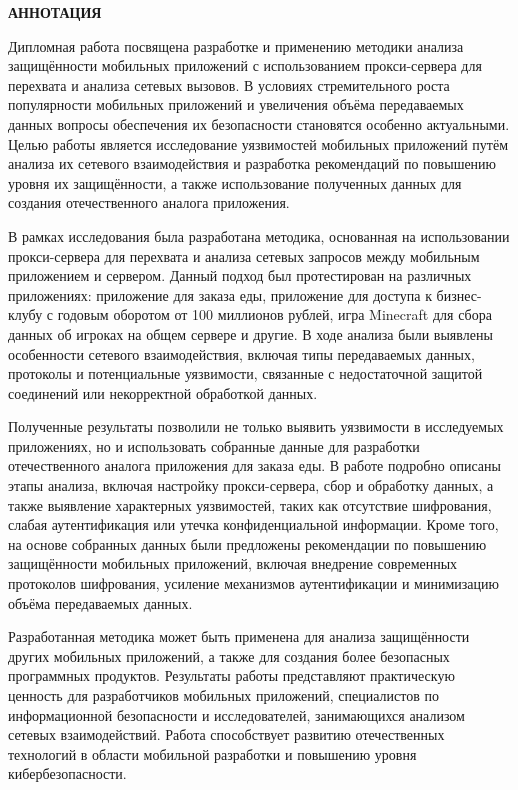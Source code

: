 \newpage
\begin{center}
  \textbf{\large АННОТАЦИЯ}
\end{center}


\setcounter{page}{2}
Дипломная работа посвящена разработке и применению методики анализа защищённости мобильных приложений с использованием прокси-сервера для перехвата и анализа сетевых вызовов. В условиях стремительного роста популярности мобильных приложений и увеличения объёма передаваемых данных вопросы обеспечения их безопасности становятся особенно актуальными. Целью работы является исследование уязвимостей мобильных приложений путём анализа их сетевого взаимодействия и разработка рекомендаций по повышению уровня их защищённости, а также использование полученных данных для создания отечественного аналога приложения.

В рамках исследования была разработана методика, основанная на использовании прокси-сервера для перехвата и анализа сетевых запросов между мобильным приложением и сервером. Данный подход был протестирован на различных приложениях: приложение для заказа еды, приложение для доступа к бизнес-клубу с годовым оборотом от 100 миллионов рублей, игра Minecraft для сбора данных об игроках на общем сервере и другие. В ходе анализа были выявлены особенности сетевого взаимодействия, включая типы передаваемых данных, протоколы и потенциальные уязвимости, связанные с недостаточной защитой соединений или некорректной обработкой данных.

Полученные результаты позволили не только выявить уязвимости в исследуемых приложениях, но и использовать собранные данные для разработки отечественного аналога приложения для заказа еды. В работе подробно описаны этапы анализа, включая настройку прокси-сервера, сбор и обработку данных, а также выявление характерных уязвимостей, таких как отсутствие шифрования, слабая аутентификация или утечка конфиденциальной информации. Кроме того, на основе собранных данных были предложены рекомендации по повышению защищённости мобильных приложений, включая внедрение современных протоколов шифрования, усиление механизмов аутентификации и минимизацию объёма передаваемых данных.

Разработанная методика может быть применена для анализа защищённости других мобильных приложений, а также для создания более безопасных программных продуктов. Результаты работы представляют практическую ценность для разработчиков мобильных приложений, специалистов по информационной безопасности и исследователей, занимающихся анализом сетевых взаимодействий. Работа способствует развитию отечественных технологий в области мобильной разработки и повышению уровня кибербезопасности.


